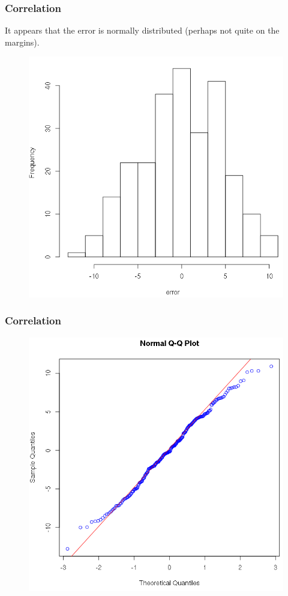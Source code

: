 \documentclass[xcolor=dvipsnames]{beamer}
\begin{document}
\begin{frame}
  \frametitle{Correlation}
  It appears that the error is normally distributed (perhaps not quite
  on the margins).
\begin{figure}[h]
\includegraphics[scale=.3]{./diagrams/bf-04.png}
\end{figure}
\end{frame}

\begin{frame}
  \frametitle{Correlation}
\begin{figure}[h]
\includegraphics[scale=.35]{./diagrams/bf-05.png}
\end{figure}
\end{frame}
\end{document}
